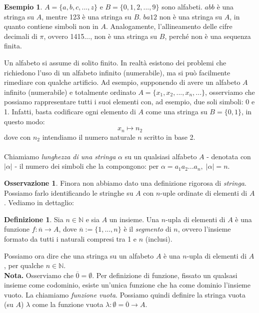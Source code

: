 \documentclass[12pt,a4paper]{report}
\theoremstyle{definition}
\newtheorem{defn}[teo]{Definizione}  %
\newtheorem{es}[teo]{Esempio}  %
\newtheorem{oss}[teo]{Osservazione}  %
\begin{document}
\begin{es}
$A=\{a,b,c,...,z\}$ e $B=\{0,1,2,...,9\}$ sono alfabeti. $abb$ è una stringa su $A$, mentre 123 è una stringa su $B$. $ba12$ non è una stringa su $A$, in quanto contiene simboli non in $A$. Analogamente, l'allineamento delle cifre decimali di $\pi$, ovvero 1415..., non è una stringa su $B$, perché non è una sequenza finita.
\end{es}

Un alfabeto si assume di solito finito. In realtà esistono dei problemi che richiedono l'uso di un alfabeto infinito (numerabile), ma si può facilmente rimediare con qualche artificio. Ad esempio, supponendo di avere un alfabeto $A$ infinito (numerabile) e totalmente ordinato $A=\{x_1,x_2,...,x_n,...\}$, osserviamo che possiamo rappresentare tutti i suoi elementi con, ad esempio, due soli simboli: 0 e 1. Infatti, basta codificare ogni elemento di $A$ come una stringa su $B=\{0,1\}$, in questo modo: 
$$x_n \mapsto n_2$$ 
dove con $n_2$ intendiamo il numero naturale $n$ scritto in base 2.\\
\\
Chiamiamo \emph{lunghezza di una stringa} $\alpha$ su un qualsiasi alfabeto $A$ - denotata con $|\alpha|$ - il numero dei simboli che la compongono: per $\alpha=a_1 a_2 ... a_n, \; |\alpha|=n$.

\begin{oss}
Finora non abbiamo dato una definizione rigorosa di \emph{stringa}. Possiamo farlo identificando le stringhe su $A$ con $n$-uple ordinate di elementi di $A$. Vediamo in dettaglio:
\begin{defn}
Sia $n \in \mathbb{N}$ e sia $A$ un insieme. Una $n$-upla di elementi di $A$ è una funzione $f: \overline{n} \longrightarrow A$, dove $\overline{n}:=\{1,...,n\}$ è il \emph{segmento} di $n$, ovvero l'insieme formato da tutti i naturali compresi tra 1 e $n$ (inclusi).
\end{defn}
Possiamo ora dire che una stringa su un alfabeto $A$ è una $n$-upla di elementi di $A$, per qualche $n \in \mathbb{N}$.\\
\noindent \textbf{Nota.} Osserviamo che $\overline{0}=\emptyset$. Per definizione di funzione, fissato un qualsasi insieme come codominio, esiste un'unica funzione che ha come dominio l'insieme vuoto. La chiamiamo \emph{funzione vuota}. Possiamo quindi definire la stringa vuota (su $A$) $\lambda$ come la funzione vuota $\lambda : \emptyset = \overline{0} \longrightarrow A$.
\end{oss}
\end{document}
